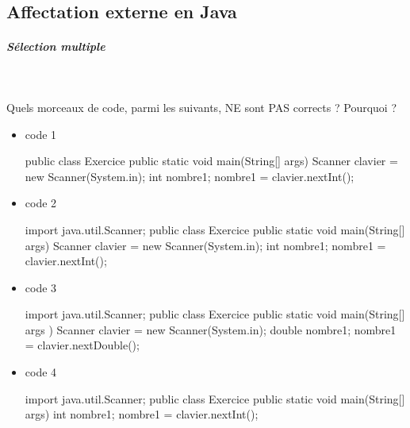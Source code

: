 \documentclass[11pt,a4paper]{article}
\begin{document}
        \subsection{Affectation externe en Java}
			
		\subparagraph{S\'election multiple} 
		
                \textcolor{white}{.} \par
            Quels morceaux de code, parmi les suivants, NE sont PAS corrects ? Pourquoi ?
						
            \begin{itemize} 
        
            \item[ \ding{"6F} ]  
							code 1
							\begin{Java}
    public class Exercice { 
        public static void main(String[] args) { 
            Scanner clavier = new Scanner(System.in); 
            int nombre1; 
            nombre1 = clavier.nextInt();
        } 
    }						\end{Java}
        
            \item[ \ding{"6F} ]  
							code 2
							\begin{Java}
    import java.util.Scanner;
    public class Exercice {  
        public static void main(String[] args) {
            Scanner clavier = new Scanner(System.in);
            int nombre1;
            nombre1 = clavier.nextInt();
        }  
    }						\end{Java}
        
            \item[ \ding{"6F} ]  
							code 3
							\begin{Java}
    import java.util.Scanner;
    public class Exercice {
        public static void main(String[] args ) {
            Scanner clavier = new Scanner(System.in); 
            double nombre1;  
            nombre1 = clavier.nextDouble();  
        }
    }						\end{Java}
        
            \item[ \ding{"6F} ]  
							code 4
							\begin{Java}
    import java.util.Scanner;
    public class Exercice { 
        public static void main(String[] args) {
            int nombre1;  
            nombre1 = clavier.nextInt(); 
        }
    }						\end{Java}
        
            \end{itemize} 
        
\end{document}
